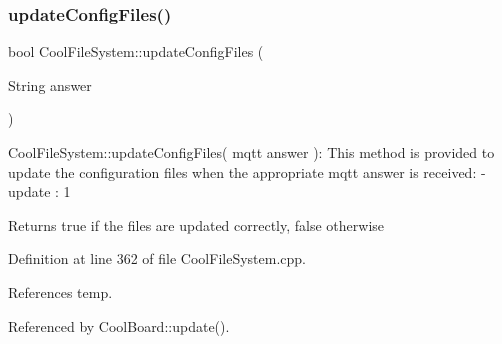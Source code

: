 \subsubsection{\texorpdfstring{update\+Config\+Files()}{updateConfigFiles()}}
{\footnotesize\ttfamily bool Cool\+File\+System\+::update\+Config\+Files (\begin{DoxyParamCaption}\item[{String}]{answer }\end{DoxyParamCaption})}

Cool\+File\+System\+::update\+Config\+Files( mqtt answer )\+: This method is provided to update the configuration files when the appropriate mqtt answer is received\+: -\/update \+: 1

\begin{DoxyReturn}{Returns}
true if the files are updated correctly, false otherwise 
\end{DoxyReturn}


Definition at line 362 of file Cool\+File\+System.\+cpp.



References temp.



Referenced by Cool\+Board\+::update().


